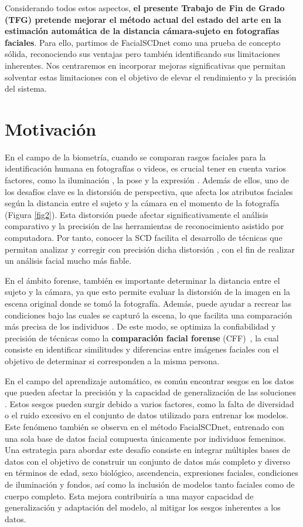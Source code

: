 Considerando todos estos aspectos, \textbf{el presente Trabajo de Fin de Grado (TFG) pretende mejorar el método actual del estado del arte en la estimación automática de la distancia cámara-sujeto en fotografías faciales}. Para ello, partimos de FacialSCDnet como una prueba de concepto sólida, reconociendo sus ventajas pero también identificando sus limitaciones inherentes. Nos centraremos en incorporar mejoras significativas que permitan solventar estas limitaciones con el objetivo de elevar el rendimiento y la precisión del sistema.

\section{Motivación}

En el campo de la biometría, cuando se comparan rasgos faciales para la identificación humana en fotografías o videos, es crucial tener en cuenta varios factores, como la iluminación \cite{92,93}, la pose \cite{90} y la expresión \cite{89,91}. Además de ellos, uno de los desafíos clave es la distorsión de perspectiva, que afecta los atributos faciales según la distancia entre el sujeto y la cámara en el momento de la fotografía (Figura \ref{fig2}). Esta distorsión puede afectar significativamente el análisis comparativo y la precisión de las herramientas de reconocimiento asistido por computadora. Por tanto, conocer la SCD  facilita el desarrollo de técnicas que permitan analizar y corregir con precisión dicha distorsión \cite{16, 88}, con el fin de realizar un análisis facial mucho más fiable.

En el ámbito forense, también es importante determinar la distancia entre el sujeto y la cámara, ya que esto permite evaluar la distorsión de la imagen en la escena original donde se tomó la fotografía. Además, puede ayudar a recrear las condiciones bajo las cuales se capturó la escena, lo que facilita una comparación más precisa de los individuos \cite{94}. De este modo, se optimiza la confiabilidad y precisión de técnicas como la \textbf{comparación facial forense} (CFF)~\cite{3}, la cual consiste en identificar similitudes y diferencias entre imágenes faciales con el objetivo de determinar si corresponden a la misma persona.

En el campo del aprendizaje automático, es común encontrar sesgos en los datos que pueden afectar la precisión y la capacidad de generalización de las soluciones \cite{95}. Estos sesgos pueden surgir debido a varios factores, como la falta de diversidad o el ruido excesivo en el conjunto de datos utilizado para entrenar los modelos. Este fenómeno también se observa en el método FacialSCDnet, entrenado con una sola base de datos facial compuesta únicamente por individuos femeninos.
Una estrategia para abordar este desafío consiste en integrar múltiples bases de datos con el objetivo de construir un conjunto de datos más completo y diverso en términos de edad, sexo biológico, ascendencia, expresiones faciales, condiciones de iluminación y fondos, así como la inclusión de modelos tanto faciales como de cuerpo completo. Esta mejora contribuiría a una mayor capacidad de generalización y adaptación del modelo, al mitigar los sesgos inherentes a los datos.

